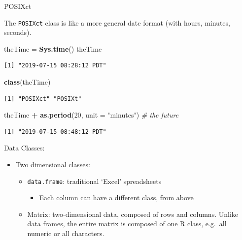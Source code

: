 \documentclass[
  ignorenonframetext,
]{beamer}
\newenvironment{Shaded}{\begin{snugshade}}{\end{snugshade}}
\newcommand{\CommentTok}[1]{\textcolor[rgb]{0.56,0.35,0.01}{\textit{#1}}}
\newcommand{\DataTypeTok}[1]{\textcolor[rgb]{0.13,0.29,0.53}{#1}}
\newcommand{\DecValTok}[1]{\textcolor[rgb]{0.00,0.00,0.81}{#1}}
\newcommand{\KeywordTok}[1]{\textcolor[rgb]{0.13,0.29,0.53}{\textbf{#1}}}
\newcommand{\NormalTok}[1]{#1}
\newcommand{\OperatorTok}[1]{\textcolor[rgb]{0.81,0.36,0.00}{\textbf{#1}}}
\newcommand{\StringTok}[1]{\textcolor[rgb]{0.31,0.60,0.02}{#1}}
\providecommand{\tightlist}{%
  \setlength{\itemsep}{0pt}\setlength{\parskip}{0pt}}
\begin{document}
\begin{frame}[fragile]{POSIXct}
\protect\hypertarget{posixct}{}

The \texttt{POSIXct} class is like a more general date format (with
hours, minutes, seconds).

\begin{Shaded}
\begin{Highlighting}[]
\NormalTok{theTime =}\StringTok{ }\KeywordTok{Sys.time}\NormalTok{()}
\NormalTok{theTime}
\end{Highlighting}
\end{Shaded}

\begin{verbatim}
[1] "2019-07-15 08:28:12 PDT"
\end{verbatim}

\begin{Shaded}
\begin{Highlighting}[]
\KeywordTok{class}\NormalTok{(theTime)}
\end{Highlighting}
\end{Shaded}

\begin{verbatim}
[1] "POSIXct" "POSIXt" 
\end{verbatim}

\begin{Shaded}
\begin{Highlighting}[]
\NormalTok{theTime }\OperatorTok{+}\StringTok{ }\KeywordTok{as.period}\NormalTok{(}\DecValTok{20}\NormalTok{, }\DataTypeTok{unit =} \StringTok{"minutes"}\NormalTok{) }\CommentTok{# the future}
\end{Highlighting}
\end{Shaded}

\begin{verbatim}
[1] "2019-07-15 08:48:12 PDT"
\end{verbatim}

\end{frame}

\begin{frame}[fragile]{Data Classes:}
\protect\hypertarget{data-classes-2}{}

\begin{itemize}
\tightlist
\item
  Two dimensional classes:

  \begin{itemize}
  \tightlist
  \item
    \texttt{data.frame}: traditional `Excel' spreadsheets

    \begin{itemize}
    \tightlist
    \item
      Each column can have a different class, from above
    \end{itemize}
  \item
    Matrix: two-dimensional data, composed of rows and columns. Unlike
    data frames, the entire matrix is composed of one R class, e.g.~all
    numeric or all characters.
  \end{itemize}
\end{itemize}

\end{frame}
\end{document}

